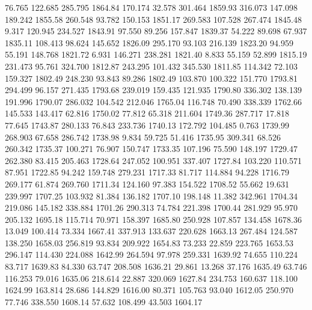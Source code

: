   76.765  122.685  285.795      1864.84
 170.174   32.578  301.464      1859.93
 316.073  147.098  189.242      1855.58
 260.548   93.782  150.153      1851.17
 269.583  107.528  267.474      1845.48
   9.317  120.945  234.527      1843.91
  97.550   89.256  157.847      1839.37
  54.222   89.698   67.937      1835.11
 108.413   98.624  145.652      1826.09
 295.170   93.103  216.139      1823.20
  94.959   55.191  148.768      1821.72
   6.931  146.271  238.281      1821.40
   8.833   55.159   52.899      1815.19
 231.473   95.761  324.700      1812.87
 243.295  101.432  345.530      1811.85
 114.342   72.103  159.327      1802.49
 248.230   93.843   89.286      1802.49
 103.870  100.322  151.770      1793.81
 294.499   96.157  271.435      1793.68
 239.019  159.435  121.935      1790.80
 336.302  138.139  191.996      1790.07
 286.032  104.542  212.046      1765.04
 116.748   70.490  338.339      1762.66
 145.533  143.417   62.816      1750.02
  77.812   65.318  211.604      1749.36
 287.717   17.818   77.645      1743.87
 280.133   76.843  233.736      1740.13
 172.792  104.485    0.763      1739.99
 268.903   67.658  286.742      1738.98
   9.834   59.725   51.416      1735.95
 309.341   68.526  260.342      1735.37
 100.271   76.907  150.747      1733.35
 107.196   75.590  148.197      1729.47
 262.380   83.415  205.463      1728.64
 247.052  100.951  337.407      1727.84
 103.220  110.571   87.951      1722.85
  94.242  159.748  279.231      1717.33
  81.717  114.884   94.228      1716.79
 269.177   61.874  269.760      1711.34
 124.160   97.383  154.522      1708.52
  55.662   19.631  239.997      1707.25
 103.932   81.384  136.182      1707.10
 198.148   11.382  342.961      1704.34
 219.086  145.182  338.884      1701.26
 290.313   74.784  221.398      1700.44
 281.929   95.970  205.132      1695.18
 115.714   70.971  158.397      1685.80
 250.928  107.857  134.458      1678.36
  13.049  100.414   73.334      1667.41
 337.913  133.637  220.628      1663.13
 267.484  124.587  138.250      1658.03
 256.819   93.834  209.922      1654.83
  73.233   22.859  223.765      1653.53
 296.147  114.430  224.088      1642.99
 264.594   97.978  259.331      1639.92
  74.655  110.224   83.717      1639.83
  84.330   63.747  208.508      1636.21
  29.861   13.268   37.176      1635.49
  63.746  116.253   79.016      1635.06
 218.614   22.887  320.069      1627.84
 234.753  160.637  118.100      1624.99
 163.814   28.686  144.829      1616.00
  80.371  105.763   93.040      1612.05
 250.970   77.746  338.550      1608.14
  57.632  108.499   43.503      1604.17
